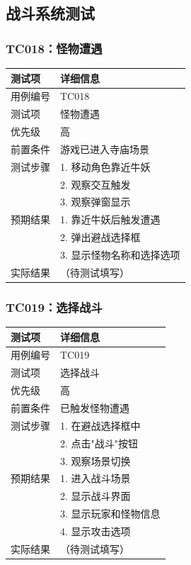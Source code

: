 \documentclass[a4paper,12pt]{article}
\begin{document}
\subsection{战斗系统测试}

\subsubsection{TC018：怪物遭遇}
\begin{table}[h]
\centering
\begin{tabular}{ll}
\toprule
测试项 & 详细信息 \\
\midrule
用例编号 & TC018 \\
测试项 & 怪物遭遇 \\
优先级 & 高 \\
前置条件 & 游戏已进入寺庙场景 \\
测试步骤 & 1. 移动角色靠近牛妖 \\
 & 2. 观察交互触发 \\
 & 3. 观察弹窗显示 \\
预期结果 & 1. 靠近牛妖后触发遭遇 \\
 & 2. 弹出避战选择框 \\
 & 3. 显示怪物名称和选择选项 \\
实际结果 & （待测试填写） \\
\bottomrule
\end{tabular}
\end{table}

\subsubsection{TC019：选择战斗}
\begin{table}[h]
\centering
\begin{tabular}{ll}
\toprule
测试项 & 详细信息 \\
\midrule
用例编号 & TC019 \\
测试项 & 选择战斗 \\
优先级 & 高 \\
前置条件 & 已触发怪物遭遇 \\
测试步骤 & 1. 在避战选择框中 \\
 & 2. 点击"战斗"按钮 \\
 & 3. 观察场景切换 \\
预期结果 & 1. 进入战斗场景 \\
 & 2. 显示战斗界面 \\
 & 3. 显示玩家和怪物信息 \\
 & 4. 显示攻击选项 \\
实际结果 & （待测试填写） \\
\bottomrule
\end{tabular}
\end{table}
\end{document}
